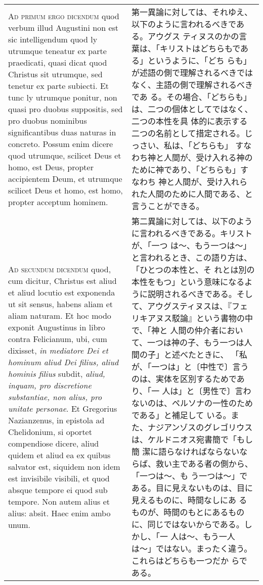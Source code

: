 \documentclass[10pt]{jsarticle} %
\begin{document}
\begin{longtable}{p{21em}p{21em}}
\\


{\scshape Ad primum ergo dicendum} quod verbum illud Augustini non est
sic intelligendum quod ly utrumque teneatur ex parte praedicati, quasi
dicat quod Christus sit utrumque, sed tenetur ex parte subiecti. Et
tunc ly utrumque ponitur, non quasi pro duobus suppositis, sed pro
duobus nominibus significantibus duas naturas in concreto. Possum enim
dicere quod utrumque, scilicet Deus et homo, est Deus, propter
accipientem Deum, et utrumque scilicet Deus et homo, est homo, propter
acceptum hominem.


&

第一異論に対しては、それゆえ、以下のように言われるべきである。アウグス
ティヌスのかの言葉は、「キリストはどちらもである」というように、「どち
らも」が述語の側で理解されるべきではなく、主語の側で理解されるべきであ
る。その場合、「どちらも」は、二つの個体としてではなく、二つの本性を具
体的に表示する二つの名前として措定される。じっさい、私は、「どちらも」
すなわち神と人間が、受け入れる神のために神であり、「どちらも」すなわち
神と人間が、受け入れられた人間のために人間である、と言うことができる。

\\


{\scshape Ad secundum dicendum} quod, cum dicitur, Christus est aliud
et aliud locutio est exponenda ut sit sensus, habens aliam et aliam
naturam. Et hoc modo exponit Augustinus in libro contra Felicianum,
ubi, cum dixisset, {\itshape in mediatore Dei et hominum aliud Dei
filius, aliud hominis filius} subdit, {\itshape aliud, inquam, pro
discretione substantiae, non alius, pro unitate personae}. Et
Gregorius Nazianzenus, in epistola ad Chelidonium, si oportet
compendiose dicere, aliud quidem et aliud ea ex quibus salvator est,
siquidem non idem est invisibile visibili, et quod absque tempore ei
quod sub tempore. Non autem alius et alius: absit. Haec enim ambo
unum.


&

第二異論に対しては、以下のように言われるべきである。キリストが、「一つ
は〜、もう一つは〜」と言われるとき、この語り方は、「ひとつの本性と、そ
れとは別の本性をもつ」という意味になるように説明されるべきである。そし
て、アウグスティヌスは、『フェリキアヌス駁論』という書物の中で、「神と
人間の仲介者において、一つは神の子、もう一つは人間の子」と述べたときに、
「私が、「一つは」と〔中性で〕言うのは、実体を区別するためであり、「一
人は」と〔男性で〕言わないのは、ペルソナの一性のためである」と補足して
いる。また、ナジアンゾスのグレゴリウスは、ケルドニオス宛書簡で「もし簡
潔に語らなければならないならば、救い主である者の側から、「一つは〜、も
う一つは〜」である。目に見えないものは、目に見えるものに、時間なしにあ
るものが、時間のもとにあるものに、同じではないからである。しかし、「一
人は〜、もう一人は〜」ではない。まったく違う。これらはどちらも一つだか
らである。



\end{longtable}
\end{document}
